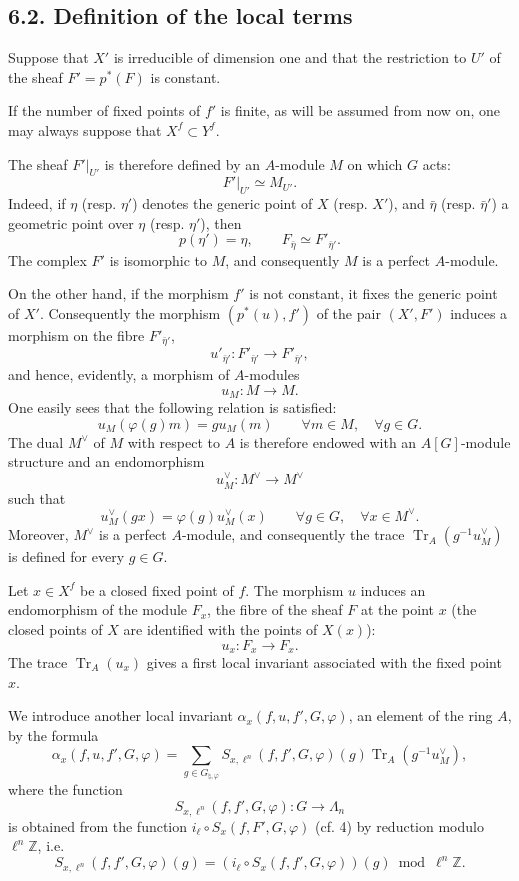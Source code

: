 \documentclass[11pt]{article}
\providecommand{\Tr}{\operatorname{Tr}}
\providecommand{\Tr}{\operatorname{Tr}}
\providecommand{\Tr}{\operatorname{Tr}}
\providecommand{\Tr}{\operatorname{Tr}}
\providecommand{\La}{\Lambda}
\providecommand{\bZ}{\mathbb Z}
\providecommand{\Tr}{\operatorname{Tr}}
\begin{document}
\subsection*{6.2. Definition of the local terms}\label{sga5:XII:subsection:6.2}
Suppose that $X'$ is irreducible of dimension one and that the restriction to $U'$ of the sheaf $F'=p^*(F)$ is constant.

If the number of fixed points of $f'$ is finite, as will be assumed from now on, one may always suppose that $X^f\subset Y^f$.

The sheaf $F'|_{U'}$ is therefore defined by an $A$-module $M$ on which $G$ acts:
\[
F'|_{U'}\simeq M_{U'}.
\]
Indeed, if $\eta$ (resp. $\eta'$) denotes the generic point of $X$ (resp. $X'$), and $\bar\eta$ (resp. $\bar\eta'$) a geometric point over $\eta$ (resp. $\eta'$), then
\[
p(\eta')=\eta,\qquad F_{\bar\eta}\simeq F'_{\bar\eta'}.
\]
The complex $F'$ is isomorphic to $M$, and consequently $M$ is a perfect $A$-module.

On the other hand, if the morphism $f'$ is not constant, it fixes the generic point of $X'$. Consequently the morphism $(p^*(u),f')$ of the pair $(X',F')$ induces a morphism on the fibre $F'_{\bar\eta'}$,
\[
u'_{\bar\eta'}:F'_{\bar\eta'}\longrightarrow F'_{\bar\eta'},
\]
and hence, evidently, a morphism of $A$-modules
\[
u_M:M\longrightarrow M.
\]
One easily sees that the following relation is satisfied:
\begin{equation}\tag{6.2.1}\label{sga5:XII:equation:6.2.1}
u_M(\varphi(g)m)=g u_M(m) \qquad \forall m\in M,\quad \forall g\in G.
\end{equation}
The dual $M^\vee$ of $M$ with respect to $A$ is therefore endowed with an $A[G]$-module structure and an endomorphism
\[
u_M^\vee:M^\vee\longrightarrow M^\vee
\]
such that
\[
u_M^\vee(gx)=\varphi(g)u_M^\vee(x) \qquad \forall g\in G,\quad \forall x\in M^\vee.
\]
Moreover, $M^\vee$ is a perfect $A$-module, and consequently the trace $\Tr_A(g^{-1}u_M^\vee)$ is defined for every $g\in G$.

Let $x\in X^f$ be a closed fixed point of $f$. The morphism $u$ induces an endomorphism of the module $F_x$, the fibre of the sheaf $F$ at the point $x$ (the closed points of $X$ are identified with the points of $X(x)$):
\[
u_x:F_x\longrightarrow F_x.
\]
The trace $\Tr_A(u_x)$ gives a first local invariant associated with the fixed point $x$.

We introduce another local invariant $\alpha_x(f,u,f',G,\varphi)$, an element of the ring $A$, by the formula
\begin{equation}\tag{6.2.2}\label{sga5:XII:equation:6.2.2}
\alpha_x(f,u,f',G,\varphi)=
\sum_{g\in G_{\natural,\varphi}}
S_{x,\ell^n}(f,f',G,\varphi)(g)\Tr_A(g^{-1}u_M^\vee),
\end{equation}
where the function
\[
S_{x,\ell^n}(f,f',G,\varphi):G\longrightarrow\La_n
\]
is obtained from the function $i_\ell\circ S_x(f,F',G,\varphi)$ (cf. 4) by reduction modulo $\ell^n\bZ$, i.e.
\[
S_{x,\ell^n}(f,f',G,\varphi)(g)=
(i_\ell\circ S_x(f,f',G,\varphi))(g)\bmod \ell^n\bZ.
\]
\end{document}
